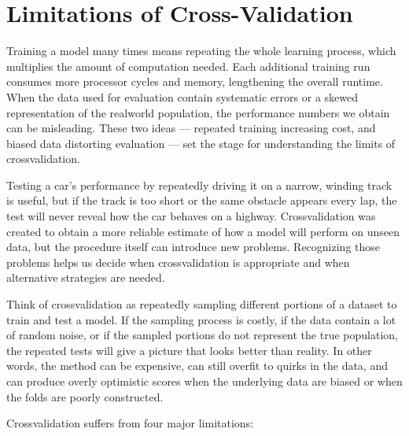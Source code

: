 \documentclass[12pt, a4paper]{article}
\begin{document}
\section{Limitations of Cross-Validation}

Training a model many times means repeating the whole learning process, which multiplies the amount of computation needed. Each additional training run consumes more processor cycles and memory, lengthening the overall runtime. When the data used for evaluation contain systematic errors or a skewed representation of the realworld population, the performance numbers we obtain can be misleading. These two ideas --- repeated training increasing cost, and biased data distorting evaluation --- set the stage for understanding the limits of crossvalidation.

Testing a car's performance by repeatedly driving it on a narrow, winding track is useful, but if the track is too short or the same obstacle appears every lap, the test will never reveal how the car behaves on a highway. Crossvalidation was created to obtain a more reliable estimate of how a model will perform on unseen data, but the procedure itself can introduce new problems. Recognizing those problems helps us decide when crossvalidation is appropriate and when alternative strategies are needed.

Think of crossvalidation as repeatedly sampling different portions of a dataset to train and test a model. If the sampling process is costly, if the data contain a lot of random noise, or if the sampled portions do not represent the true population, the repeated tests will give a picture that looks better than reality. In other words, the method can be expensive, can still overfit to quirks in the data, and can produce overly optimistic scores when the underlying data are biased or when the folds are poorly constructed.

Crossvalidation suffers from four major limitations:
\end{document}
